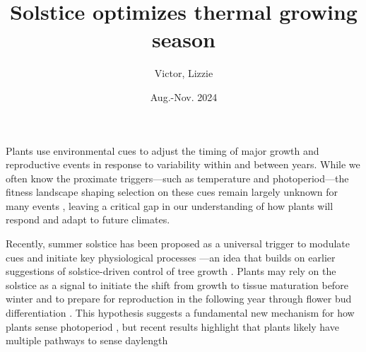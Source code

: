 \documentclass[11pt,letter]{article}
\title{Solstice optimizes thermal growing season}
\author{Victor, Lizzie}
\date{Aug.-Nov. 2024}
\begin{document}
\maketitle


Plants use environmental cues to adjust the timing of major growth and reproductive events in response to variability within and between years. While we often know the proximate triggers---such as temperature and photoperiod---the fitness landscape shaping selection on these cues remain largely unknown for many events \citep{Chuine2017}, leaving a critical gap in our understanding of how plants will respond and adapt to future climates.

Recently, summer solstice has been proposed as a universal trigger to modulate cues and initiate key physiological processes \citep{Zohner2023, Journe2024}---an idea that builds on earlier suggestions of solstice-driven control of tree growth \citep{Rossi2006}. 
Plants may rely on the solstice as a signal to initiate the shift from growth to tissue maturation before winter and to prepare for reproduction in the following year through flower bud differentiation \citep{Rossi2006, Zohner2023, Journe2024}. This hypothesis suggests a fundamental new mechanism for how plants sense photoperiod \citep{Gendron2023}, but recent results highlight that plants likely have multiple pathways to sense daylength  \citep{wang2024plants} 
\end{document}
